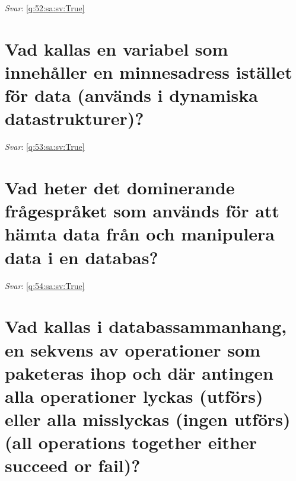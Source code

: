\documentclass[a4paper,11pt,oneside]{book}
\begin{document}
\begin{sloppypar}
\noindent\makebox[\textwidth]{\hrulefill}

\vspace{1cm}

\textit{Svar}: \autoref{q:52:sa:sv:True}



\section{Vad kallas en variabel som inneh\r{a}ller en minnesadress ist\"allet f\"or data (anv\"ands i dynamiska datastrukturer)?}

\label{q:53:sa:sv:False}

\vspace{2cm}

\noindent\makebox[\textwidth]{\hrulefill}

\vspace{1cm}

\textit{Svar}: \autoref{q:53:sa:sv:True}



\section{Vad heter det dominerande fr\r{a}gespr\r{a}ket som anv\"ands f\"or att h\"amta data fr\r{a}n och manipulera data i en databas?}

\label{q:54:sa:sv:False}

\vspace{2cm}

\noindent\makebox[\textwidth]{\hrulefill}

\vspace{1cm}

\textit{Svar}: \autoref{q:54:sa:sv:True}



\section{Vad kallas i databassammanhang, en sekvens av operationer som paketeras ihop och d\"ar antingen alla operationer lyckas (utf\"ors) eller alla misslyckas (ingen utf\"ors) (all operations together either succeed or fail)?}

\label{q:55:sa:sv:False}

\vspace{2cm}

\noindent\makebox[\textwidth]{\hrulefill}

\vspace{1cm}


\end{sloppypar}
\end{document}
